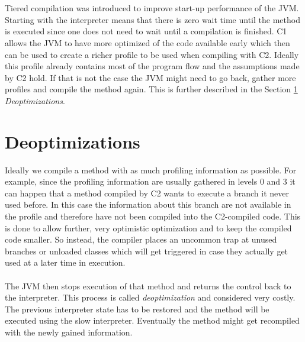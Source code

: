 \\\\
Tiered compilation was introduced to improve start-up performance of the JVM.
Starting with the interpreter means that there is zero wait time until the method is executed since one does not need to wait until a compilation is finished. C1 allows the JVM to have more optimized of the code available early which then can be used to create a richer profile to be used when compiling with C2. Ideally this profile already contains most of the program flow and the assumptions made by C2 hold. If that is not the case the JVM might need to go back, gather more profiles and compile the method again. This is further described in the Section \ref{s:deoptimizations} \textit{Deoptimizations}.

\section{Deoptimizations}
\label{s:deoptimizations}
Ideally we compile a method with as much profiling information as possible.
For example, since the profiling information are usually gathered in levels 0 and 3 it can happen that a method compiled by C2 wants to execute a branch it never used before.
In this case the information about this branch are not available in the profile and therefore have not been compiled into the C2-compiled code.
This is done to allow further, very optimistic optimization and to keep the compiled code smaller. So instead, the compiler places an uncommon trap at unused branches or unloaded classes which will get triggered in case they actually get used at a later time in execution.
\\\\
The JVM then stops execution of that method and returns the control back to the interpreter. This process is called \textit{deoptimization} and considered very costly. The previous interpreter state has to be restored and the method will be executed using the slow interpreter. Eventually the method might get recompiled with the newly gained information.

